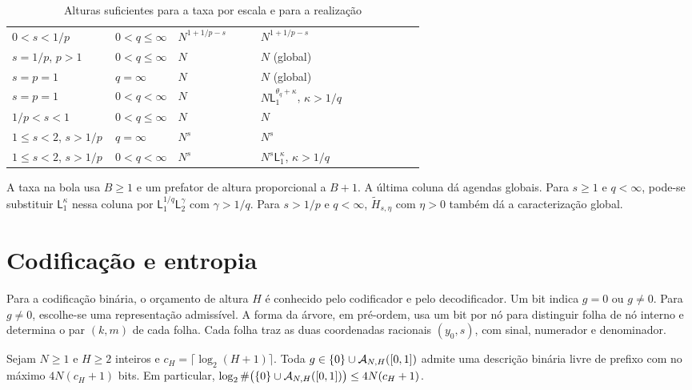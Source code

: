\documentclass[12pt,a4paper]{article}
\begin{document}
\begin{table}[H]
\centering
\caption{Alturas suficientes para a taxa por escala e para a realização}
\label{lp:tab:schedules}
\small
\tablecolors
\begin{tabularx}{\linewidth}{L{0.25\linewidth}L{0.15\linewidth}L{0.20\linewidth}>{\raggedright\arraybackslash}X}
\toprule
{} &  &  &  \\
\midrule
$0<s<1/p$ & $0<q\le\infty$ & $N^{1+1/p-s}$ & $N^{1+1/p-s}$ \\
$s=1/p$, $p>1$ & $0<q\le\infty$ & $N$ & $N$ (global) \\
$s=p=1$ & $q=\infty$ & $N$ & $N$ (global) \\
$s=p=1$ & $0<q<\infty$ & $N$ & $N\mathsf L_1^{\theta_q+\kappa}$, $\kappa>1/q$ \\
$1/p<s<1$ & $0<q\le\infty$ & $N$ & $N$ \\
$1\le s<2$, $s>1/p$ & $q=\infty$ & $N^s$ & $N^s$ \\
$1\le s<2$, $s>1/p$ & $0<q<\infty$ & $N^s$ & $N^s\mathsf L_1^\kappa$, $\kappa>1/q$ \\
\bottomrule
\end{tabularx}
\par\raggedright
\tablecredit
\par\smallskip\noindent
A taxa na bola usa $B\ge1$ e um prefator de altura proporcional a $B+1$. A última coluna dá agendas globais. Para $s\ge1$ e $q<\infty$, pode-se substituir $\mathsf L_1^\kappa$ nessa coluna por $\mathsf L_1^{1/q}\mathsf L_2^\gamma$ com $\gamma>1/q$. Para $s>1/p$ e $q<\infty$, $\widetilde H_{s,\eta}$ com $\eta>0$ também dá a caracterização global.
\end{table}

\section{Codificação e entropia}
\label{lp:sec:bits}

Para a codificação binária, o orçamento de altura $H$ é conhecido pelo codificador e pelo decodificador. Um bit indica $g=0$ ou $g\ne0$. Para $g\ne0$, escolhe-se uma representação admissível. A forma da árvore, em pré-ordem, usa um bit por nó para distinguir folha de nó interno e determina o par $(k,m)$ de cada folha. Cada folha traz as duas coordenadas racionais $(y_0,s)$, com sinal, numerador e denominador.

\begin{proposicao}
\label{lp:prop:bits}
Sejam $N\ge1$ e $H\ge2$ inteiros e $c_H=\lceil\log_2(H+1)\rceil$. Toda $g\in\{0\}\cup\mathcal A_{N,H}([0,1])$ admite uma descrição binária livre de prefixo com no máximo $4N(c_H+1)$ bits. Em particular, $\log_2\#\bigl(\{0\}\cup\mathcal A_{N,H}([0,1])\bigr)\le4N(c_H+1)$.
\end{proposicao}
\end{document}
